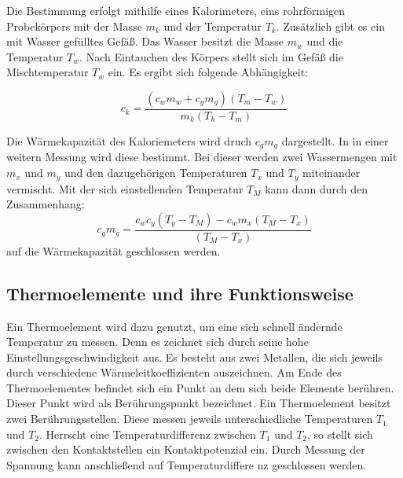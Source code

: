 Die Bestimmung erfolgt mithilfe eines Kalorimeters,
eins rohrförmigen Probekörpers mit der Masse $m_k$ und der Temperatur 
$T_k$. Zusätzlich gibt es ein mit Wasser gefülltes Gefäß.
Das Wasser besitzt die Masse $m_w$ und die Temperatur $T_w$.
Nach Eintauchen des Körpers stellt sich im Gefäß die 
Mischtemperatur $T_w$ ein. 
Es ergibt sich folgende Abhängigkeit:

\begin{equation*}
\label{eq:zusammenhang_ck}
c_k=\frac{\left(c_wm_w+c_gm_g\right)\left(T_m-T_w\right)}{m_k\left(T_k-T_m\right)}
\end{equation*}

Die Wärmekapazität des Kaloriemeters wird druch $c_gm_g$ dargestellt.
In in einer weitern Messung wird diese bestimmt.
Bei dieser werden zwei Wassermengen mit $m_x$ und $m_y$ und den 
dazugehörigen Temperaturen $T_x$ und $T_y$ miteinander vermischt.
Mit der sich einstellenden Temperatur $T_M$ kann dann
durch den Zusammenhang:
\begin{equation}
\label{eq:zusammenhang_cgmg}
c_gm_g=\frac{c_wc_y\left(T_y-T_M\right)-c_wm_x\left(T_M-T_x\right)}{\left(T_M-T_x\right)}
\end{equation}
auf die Wärmekapazität geschlossen werden.

\subsection{Thermoelemente und ihre Funktionsweise} %

Ein Thermoelement wird dazu genutzt, um eine sich schnell ändernde 
Temperatur zu messen. 
Denn es zeichnet sich durch seine hohe Einstellungsgeschwindigkeit aus.
Es besteht aus zwei Metallen, die sich jeweils durch
verschiedene Wärmeleitkoeffizienten auszeichnen.
Am Ende des Thermoelementes befindet sich ein Punkt an dem sich
beide Elemente berühren. Dieser Punkt wird als Berührungspunkt 
bezeichnet.
Ein Thermoelement besitzt zwei Berührungsstellen.
Diese messen jeweils unterschiedliche Temperaturen $T_1$ und $T_2$.
Herrscht eine Temperaturdifferenz zwischen $T_1$ und $T_2$, so 
stellt sich zwischen den Kontaktstellen ein Kontaktpotenzial 
ein. 
Durch Messung der Spannung kann anschließend auf 
Temperaturdiffere	nz geschlossen werden.







